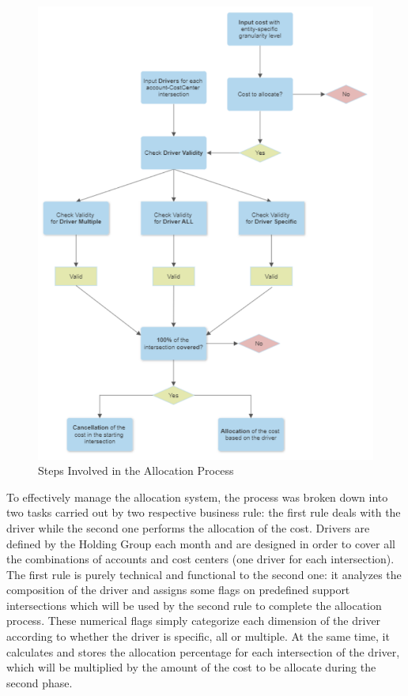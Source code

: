 \documentclass[12pt,a4paper,openright,twoside]{book}
\begin{document}
\begin{figure}[htbp]
	\centering
	\includegraphics[width=\linewidth]{figures/process.pdf}
	\caption{Steps Involved in the Allocation Process}
	\label{fig:process}
\end{figure}

To effectively manage the allocation system, the process was broken down into two tasks carried out by two respective business rule: the first rule deals with the driver while the second one performs the allocation of the cost.
%
Drivers are defined by the Holding Group each month and are designed in order to cover all the combinations of accounts and cost centers (one driver for each intersection).
%
The first rule is purely technical and functional to the second one: it analyzes the composition of the driver and assigns some flags on predefined support intersections which will be used by the second rule to complete the allocation process.
%
These numerical flags simply categorize each dimension of the driver according to whether the driver is specific, all or multiple.
%
At the same time, it calculates and stores the allocation percentage for each intersection of the driver, which will be multiplied by the amount of the cost to be allocate during the second phase.
\end{document}
